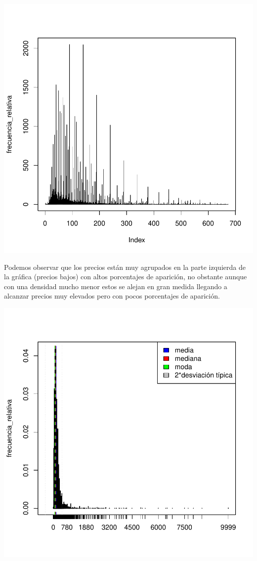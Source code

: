 \documentclass [a4paper] {article}
\begin{document}
\begin{center}
\includegraphics{entrega-frecuencia_relativa_BNB_plot}
\end{center}

Podemos observar que los precios están muy agrupados en la parte izquierda de la gráfica (precios bajos) con altos porcentajes de aparición,
no obstante aunque con una densidad mucho menor estos se alejan en gran medida llegando a alcanzar precios muy elevados pero con pocos porcentajes de aparición.

\begin{center}
\includegraphics{entrega-estadisticos_BNB_plot}
\end{center}
\end{document}
